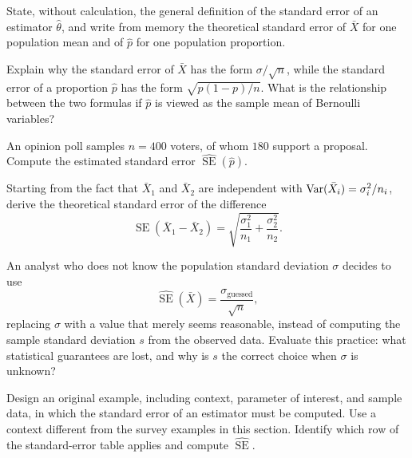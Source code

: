 \begin{problema}\label{prob:395183d}
State, without calculation, the general definition of the standard error of an estimator $\hat\theta$, and write from memory the theoretical standard error of $\bar X$ for one population mean and of $\hat p$ for one population proportion.
\end{problema}

\begin{problema}\label{prob:8a98763}
Explain why the standard error of $\bar X$ has the form $\sigma/\sqrt n$, while the standard error of a proportion $\hat p$ has the form $\sqrt{p(1-p)/n}$. What is the relationship between the two formulas if $\hat p$ is viewed as the sample mean of Bernoulli variables?
\end{problema}

\begin{problema}\label{prob:0d972a2}
An opinion poll samples $n=400$ voters, of whom $180$ support a proposal. Compute the estimated standard error $\widehat{\operatorname{SE}}(\hat p)$.
\end{problema}

\begin{problema}\label{prob:a48a78a}
Starting from the fact that $\bar X_1$ and $\bar X_2$ are independent with $\operatorname{Var}(\bar X_i)=\sigma_i^2/n_i$, derive the theoretical standard error of the difference
\[
	\operatorname{SE}(\bar X_1-\bar X_2)=\sqrt{\frac{\sigma_1^2}{n_1}+\frac{\sigma_2^2}{n_2}}.
\]
\end{problema}

\begin{problema}\label{prob:acdadd3}
An analyst who does not know the population standard deviation $\sigma$ decides to use
\[
	\widehat{\operatorname{SE}}(\bar X)=\frac{\sigma_{\text{guessed}}}{\sqrt n},
\]
replacing $\sigma$ with a value that merely seems reasonable, instead of computing the sample standard deviation $s$ from the observed data. Evaluate this practice: what statistical guarantees are lost, and why is $s$ the correct choice when $\sigma$ is unknown?
\end{problema}

\begin{problema}\label{prob:aaefa50}
Design an original example, including context, parameter of interest, and sample data, in which the standard error of an estimator must be computed. Use a context different from the survey examples in this section. Identify which row of the standard-error table applies and compute $\widehat{\operatorname{SE}}$.
\end{problema}

